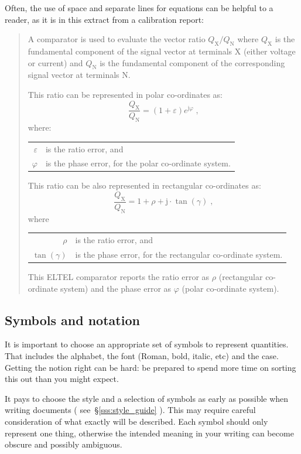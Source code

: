 Often, the use of space and separate lines for equations can be helpful to a reader, as it is in this extract from a calibration report:
\begin{quote}

A comparator is used to evaluate the vector ratio $Q_\mathrm{X}/Q_\mathrm{N}$ where $Q_\mathrm{X}$ is the fundamental component of the signal vector at terminals X (either voltage or current) and $Q_\mathrm{N}$ is the fundamental component of the corresponding signal vector at terminals N. 

This ratio can be represented in polar co-ordinates as:
\[
\frac{Q_\mathrm{X}}{Q_\mathrm{N}} = (1 + \varepsilon) e^{\mathrm{j}\varphi} \;,
\]
where:

\begin{tabular}{rl}
$\varepsilon$ & is the ratio error, and \\
$\varphi$ & is the phase error, for the polar co-ordinate system. 
\end{tabular}

\vspace{\baselineskip}
This ratio can be also represented in rectangular co-ordinates as:
\[
\frac{Q_\mathrm{X}}{Q_\mathrm{N}} = 1 + \rho + \mathrm{j}\cdot\tan (\gamma) \;,
\]
where
\begin{tabular}{rl}
	$\rho$ &  is the ratio error, and \\
	$\tan (\gamma)$ & is the phase error, for the rectangular co-ordinate system. 
\end{tabular}

\vspace{\baselineskip}	
This ELTEL comparator reports the ratio error as $\rho$ (rectangular co-ordinate system) and the phase error as $\varphi$ (polar co-ordinate system).
\end{quote}

\subsection{Symbols and notation}
It is important to choose an appropriate set of symbols to represent quantities. That includes the alphabet, the font (Roman, bold, italic, etc) and the case. Getting the notion right can be hard: be prepared to spend more time on sorting this out than you might expect.

It pays to choose the style and a selection of symbols as early as possible when writing documents ( see~\S\ref{sss:style_guide} ). This may require careful consideration of what exactly will be described. Each symbol should only represent one thing, otherwise the intended meaning in your writing can become obscure and possibly ambiguous. 

